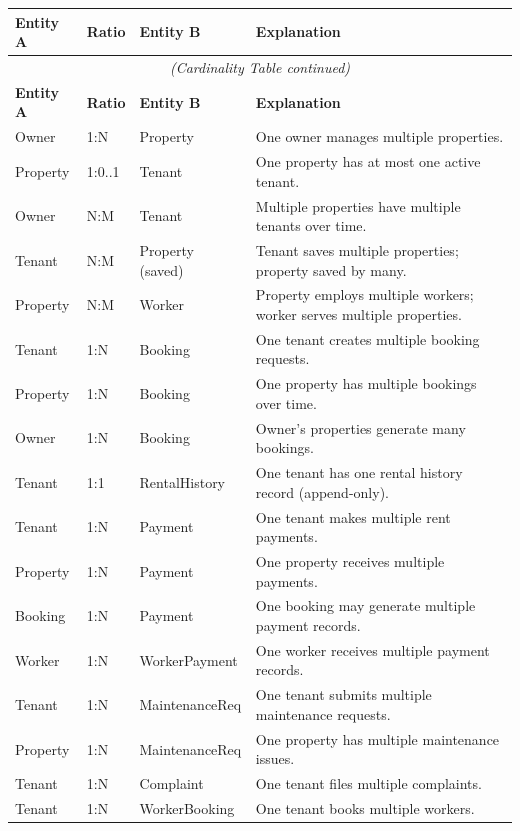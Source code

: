 \documentclass[12pt,a4paper]{article}
\begin{document}
\begin{longtable}{@{}p{3.5cm}p{1.8cm}p{3.8cm}p{6cm}@{}}
\toprule
\textbf{Entity A} & \textbf{Ratio} & \textbf{Entity B} & \textbf{Explanation} \\
\midrule
\endfirsthead
\multicolumn{4}{c}{\textit{(Cardinality Table continued)}} \\
\toprule
\textbf{Entity A} & \textbf{Ratio} & \textbf{Entity B} & \textbf{Explanation} \\
\midrule
\endhead
\bottomrule
\endfoot
Owner & 1:N & Property & One owner manages multiple properties. \\[3pt]
Property & 1:0..1 & Tenant & One property has at most one active tenant. \\[3pt]
Owner & N:M & Tenant & Multiple properties have multiple tenants over time. \\[3pt]
Tenant & N:M & Property (saved) & Tenant saves multiple properties; property saved by many. \\[3pt]
Property & N:M & Worker & Property employs multiple workers; worker serves multiple properties. \\[3pt]
Tenant & 1:N & Booking & One tenant creates multiple booking requests. \\[3pt]
Property & 1:N & Booking & One property has multiple bookings over time. \\[3pt]
Owner & 1:N & Booking & Owner's properties generate many bookings. \\[3pt]
Tenant & 1:1 & RentalHistory & One tenant has one rental history record (append-only). \\[3pt]
Tenant & 1:N & Payment & One tenant makes multiple rent payments. \\[3pt]
Property & 1:N & Payment & One property receives multiple payments. \\[3pt]
Booking & 1:N & Payment & One booking may generate multiple payment records. \\[3pt]
Worker & 1:N & WorkerPayment & One worker receives multiple payment records. \\[3pt]
Tenant & 1:N & MaintenanceReq & One tenant submits multiple maintenance requests. \\[3pt]
Property & 1:N & MaintenanceReq & One property has multiple maintenance issues. \\[3pt]
Tenant & 1:N & Complaint & One tenant files multiple complaints. \\[3pt]
Tenant & 1:N & WorkerBooking & One tenant books multiple workers. \\[3pt]

\end{longtable}
\end{document}
